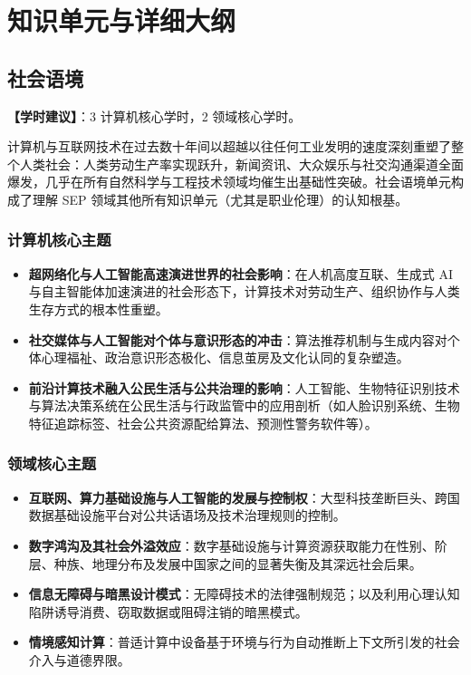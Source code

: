 \section{知识单元与详细大纲}

\subsection{社会语境}
\textbf{【学时建议】}：3 计算机核心学时，2 领域核心学时。

计算机与互联网技术在过去数十年间以超越以往任何工业发明的速度深刻重塑了整个人类社会：人类劳动生产率实现跃升，新闻资讯、大众娱乐与社交沟通渠道全面爆发，几乎在所有自然科学与工程技术领域均催生出基础性突破。社会语境单元构成了理解 SEP 领域其他所有知识单元（尤其是职业伦理）的认知根基。

\subsubsection{计算机核心主题}
\begin{itemize}
    \item \textbf{超网络化与人工智能高速演进世界的社会影响}：在人机高度互联、生成式 AI 与自主智能体加速演进的社会形态下，计算技术对劳动生产、组织协作与人类生存方式的根本性重塑。
    \item \textbf{社交媒体与人工智能对个体与意识形态的冲击}：算法推荐机制与生成内容对个体心理福祉、政治意识形态极化、信息茧房及文化认同的复杂塑造。
    \item \textbf{前沿计算技术融入公民生活与公共治理的影响}：人工智能、生物特征识别技术与算法决策系统在公民生活与行政监管中的应用剖析（如人脸识别系统、生物特征追踪标签、社会公共资源配给算法、预测性警务软件等）。
\end{itemize}

\subsubsection{领域核心主题}
\begin{itemize}
    \item \textbf{互联网、算力基础设施与人工智能的发展与控制权}：大型科技垄断巨头、跨国数据基础设施平台对公共话语场及技术治理规则的控制。
    \item \textbf{数字鸿沟及其社会外溢效应}：数字基础设施与计算资源获取能力在性别、阶层、种族、地理分布及发展中国家之间的显著失衡及其深远社会后果。
    \item \textbf{信息无障碍与暗黑设计模式}：无障碍技术的法律强制规范；以及利用心理认知陷阱诱导消费、窃取数据或阻碍注销的暗黑模式。
    \item \textbf{情境感知计算}：普适计算中设备基于环境与行为自动推断上下文所引发的社会介入与道德界限。
\end{itemize}

